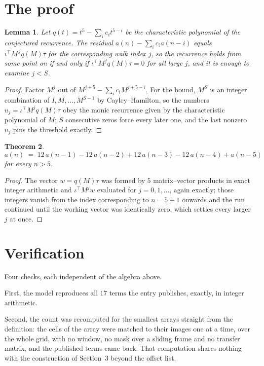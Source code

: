 \documentclass[11pt,a4paper]{article}
\theoremstyle{plain}
\newtheorem{theorem}{Theorem}
\newtheorem{lemma}[theorem]{Lemma}
\theoremstyle{definition}
\begin{document}
\section{The proof}

\begin{lemma}\label{lem:crit}
Let $q(t)=t^{5}-\sum_i c_it^{5-i}$ be the characteristic polynomial of the
conjectured recurrence. The residual $a(n)-\sum_ic_ia(n-i)$ equals
$\iota^{\!\top}M^{\,j}q(M)\tau$ for the corresponding walk index $j$, so the recurrence
holds from some point on if and only if $\iota^{\!\top}M^{j}q(M)\tau=0$ for all large $j$,
and it is enough to examine $j<S$.
\end{lemma}

\begin{proof}
Factor $M^{j}$ out of $M^{j+5}-\sum_ic_iM^{j+5-i}$. For the bound, $M^{S}$
is an integer combination of $I,M,\dots,M^{S-1}$ by Cayley--Hamilton, so the numbers
$u_j=\iota^{\!\top}M^{j}q(M)\tau$ obey the monic recurrence given by the characteristic
polynomial of $M$; $S$ consecutive zeros force every later one, and the last nonzero $u_j$
pins the threshold exactly.
\end{proof}

\begin{theorem}
\[
a(n)\;=\;12\,a(n-1) - 12\,a(n-2) + 12\,a(n-3) - 12\,a(n-4) + a(n-5)
\]
for every $n>5$.
\end{theorem}

\begin{proof}
The vector $w=q(M)\tau$ was formed by $5$ matrix--vector products in exact integer
arithmetic and $\iota^{\!\top}M^{j}w$ evaluated for $j=0,1,\dots$, again exactly; those
integers vanish from the index corresponding to $n=5+1$ onwards and the run continued
until the working vector was identically zero, which settles every larger $j$ at once.
\end{proof}

\section{Verification}

Four checks, each independent of the algebra above.

First, the model reproduces all $17$ terms the entry publishes, exactly, in integer
arithmetic.

Second, the count was recomputed for the smallest arrays straight from the definition: the
cells of the array were matched to their images one at a time, over the whole grid, with no
window, no mask over a sliding frame and no transfer matrix, and the published terms came back.
That computation shares nothing with the construction of Section~3 beyond the offset list.
\end{document}
